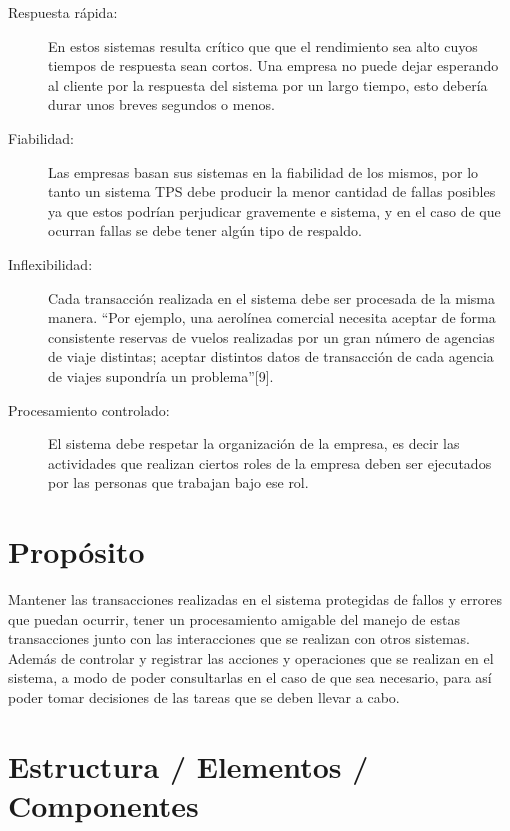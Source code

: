 \begin {description}
\item [Respuesta rápida:] En estos sistemas resulta crítico que que el rendimiento sea alto cuyos tiempos de respuesta sean cortos. Una empresa no puede dejar esperando al cliente por la respuesta del sistema por un largo tiempo, esto debería durar unos breves segundos o menos.

\item [Fiabilidad:] Las empresas basan sus sistemas en la fiabilidad de los mismos, por lo tanto un sistema TPS debe producir la menor cantidad de fallas posibles ya que estos podrían perjudicar gravemente e sistema, y en el caso de que ocurran fallas se debe tener algún tipo de respaldo.

\item [Inflexibilidad:] Cada transacción realizada en el sistema debe ser procesada de la misma manera. “Por ejemplo, una aerolínea comercial necesita aceptar de forma consistente reservas de vuelos realizadas por un gran número de agencias de viaje distintas; aceptar distintos datos de transacción de cada agencia de viajes supondría un problema”[9].

\item [Procesamiento controlado:] El sistema debe respetar la organización de la empresa, es decir las actividades que realizan ciertos roles de la empresa deben ser ejecutados por las personas que trabajan bajo ese rol.
\end {description}
\section {Propósito}

Mantener las transacciones realizadas en el sistema protegidas de fallos y errores que puedan ocurrir, tener un procesamiento amigable del manejo de estas transacciones junto con las interacciones que se realizan con otros sistemas. Además de controlar y registrar las acciones y operaciones que se realizan en el sistema, a modo de poder consultarlas en el caso de que sea necesario, para así poder tomar decisiones de las tareas que se deben llevar a cabo.

\section {Estructura / Elementos / Componentes}

